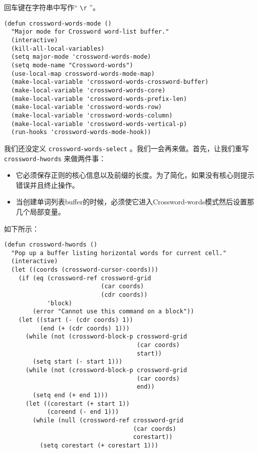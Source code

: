 回车键在字符串中写作“ \verb|\r| ”。

\begin{verbatim}
(defun crossword-words-mode ()
  "Major mode for Crossword word-list buffer."
  (interactive)
  (kill-all-local-variables)
  (setq major-mode 'crossword-words-mode)
  (setq mode-name "Crossword-words")
  (use-local-map crossword-words-mode-map)
  (make-local-variable 'crossword-words-crossword-buffer)
  (make-local-variable 'crossword-words-core)
  (make-local-variable 'crossword-words-prefix-len)
  (make-local-variable 'crossword-words-row)
  (make-local-variable 'crossword-words-column)
  (make-local-variable 'crossword-words-vertical-p)
  (run-hooks 'crossword-words-mode-hook))
\end{verbatim}

我们还没定义 \texttt{crossword-words-select} 。我们一会再来做。首先，让我们重写 \texttt{crossword-hwords} 来做两件事：

\begin{itemize}
  \item 它必须保存正则的核心信息以及前缀的长度。为了简化，如果没有核心则提示错误并且终止操作。
  \item 当创建单词列表buffer的时候，必须使它进入Crossword-words模式然后设置那几个局部变量。
\end{itemize}

如下所示：

\begin{verbatim}
(defun crossword-hwords ()
  "Pop up a buffer listing horizontal words for current cell."
  (interactive)
  (let ((coords (crossword-cursor-coords)))
    (if (eq (crossword-ref crossword-grid
                           (car coords)
                           (cdr coords))
            'block)
        (error "Cannot use this command on a block"))
    (let ((start (- (cdr coords) 1))
          (end (+ (cdr coords) 1)))
      (while (not (crossword-block-p crossword-grid
                                     (car coords)
                                     start))
        (setq start (- start 1)))
      (while (not (crossword-block-p crossword-grid
                                     (car coords)
                                     end))
        (setq end (+ end 1)))
      (let ((corestart (+ start 1))
            (coreend (- end 1)))
        (while (null (crossword-ref crossword-grid
                                    (car coords)
                                    corestart))
          (setq corestart (+ corestart 1)))
\end{verbatim}

